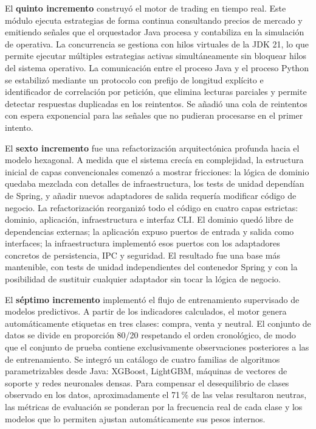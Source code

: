 El \textbf{quinto incremento} construyó el motor de trading en tiempo real. Este módulo ejecuta estrategias de forma continua consultando precios de mercado y emitiendo señales que el orquestador Java procesa y contabiliza en la simulación de operativa. La concurrencia se gestiona con hilos virtuales de la JDK 21, lo que permite ejecutar múltiples estrategias activas simultáneamente sin bloquear hilos del sistema operativo. La comunicación entre el proceso Java y el proceso Python se estabilizó mediante un protocolo con prefijo de longitud explícito e identificador de correlación por petición, que elimina lecturas parciales y permite detectar respuestas duplicadas en los reintentos. Se añadió una cola de reintentos con espera exponencial para las señales que no pudieran procesarse en el primer intento.

El \textbf{sexto incremento} fue una refactorización arquitectónica profunda hacia el modelo hexagonal. A medida que el sistema crecía en complejidad, la estructura inicial de capas convencionales comenzó a mostrar fricciones: la lógica de dominio quedaba mezclada con detalles de infraestructura, los tests de unidad dependían de Spring, y añadir nuevos adaptadores de salida requería modificar código de negocio. La refactorización reorganizó todo el código en cuatro capas estrictas: dominio, aplicación, infraestructura e interfaz CLI. El dominio quedó libre de dependencias externas; la aplicación expuso puertos de entrada y salida como interfaces; la infraestructura implementó esos puertos con los adaptadores concretos de persistencia, IPC y seguridad. El resultado fue una base más mantenible, con tests de unidad independientes del contenedor Spring y con la posibilidad de sustituir cualquier adaptador sin tocar la lógica de negocio.

El \textbf{séptimo incremento} implementó el flujo de entrenamiento supervisado de modelos predictivos. A partir de los indicadores calculados, el motor genera automáticamente etiquetas en tres clases: compra, venta y neutral. El conjunto de datos se divide en proporción 80/20 respetando el orden cronológico, de modo que el conjunto de prueba contiene exclusivamente observaciones posteriores a las de entrenamiento. Se integró un catálogo de cuatro familias de algoritmos parametrizables desde Java: XGBoost, LightGBM, máquinas de vectores de soporte y redes neuronales densas. Para compensar el desequilibrio de clases observado en los datos, aproximadamente el 71\,\% de las velas resultaron neutras, las métricas de evaluación se ponderan por la frecuencia real de cada clase y los modelos que lo permiten ajustan automáticamente sus pesos internos.

